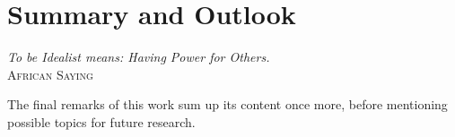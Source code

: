 %
%
%
%
%
%
%

\chapter{Summary and Outlook}
\label{summary_and_outlook_heading}

\begin{flushright}
    \textsl{To be Idealist means: Having Power for Others.}\\
    \textsc{African Saying}
\end{flushright}

The final remarks of this work sum up its content once more, before mentioning
possible topics for future research.




